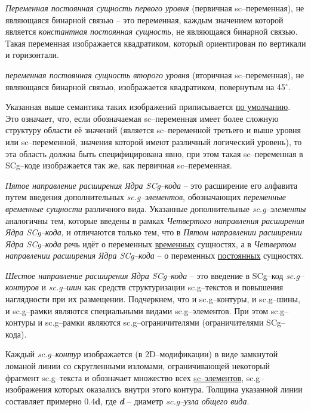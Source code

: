 \textit{Переменная постоянная сущность первого уровня } (первичная sc--переменная), не являющаяся бинарной связью -- это переменная, каждым значением которой является \textit{константная постоянная сущность}, не являющаяся бинарной связью. Такая переменная изображается квадратиком, который ориентирован по вертикали и горизонтали. 

\textit{переменная постоянная сущность второго уровня} (вторичная sc--переменная), не являющаяся бинарной связью, изображается квадратиком, повернутым на 45$^\circ$. 

Указанная выше семантика таких изображений приписывается \uline{по умолчанию}. Это означает, что, если обозначаемая sc--переменная имеет более сложную структуру области её значений (является sc--переменной третьего и выше уровня или sc--переменной, значения которой имеют различный логический уровень), то эта область должна быть специфицирована явно, при этом такая sc--переменная в SCg--коде изображается так же, как первичная sc--переменная.


	
\textit{Пятое направление расширения Ядра SCg--кода} -- это расширение его алфавита путем введения дополнительных \textit{sc.g--элементов}, обозначающих \textit{переменные временные сущности} различного вида. Указанные дополнительные \textit{sc.g--элементы} аналогичны тем, которые введены в рамках \textit{Четвертого направления расширения Ядра SCg--кода}, и отличаются только тем, что в \textit{Пятом направлении расширении Ядра SCg--кода} речь идёт о переменных \uline{временных} сущностях, а в \textit{Четвертом направлении расширения Ядра SCg--кода} -- о переменных \uline{постоянных} сущностях.



\textit{Шестое направление расширения Ядра SCg--кода} -- это введение в SCg--код \textit{sc.g--контуров} и \textit{sc.g--шин} как средств структуризации sc.g--текстов и повышения наглядности при их размещении. Подчеркнем, что и sc.g--контуры, и sc.g--шины, и sc.g--рамки являются специальными видами sc.g--элементов. При этом sc.g--контуры и sc.g--рамки являются sc.g--ограничителями (ограничителями SCg--кода).



Каждый \textit{sc.g--контур} изображается (в 2D--модификации) в виде замкнутой ломаной линии со скругленными изломами, ограничивающей некоторый фрагмент sc.g--текста и обозначает множество всех \uline{sc--элементов}, sc.g--изображения которых оказались внутри этого контура. Толщина указанной линии составляет примерно $\bm{0.4d}$, где \textbf{\textit{d}} -- диаметр \textit{sc.g--узла общего вида}.

